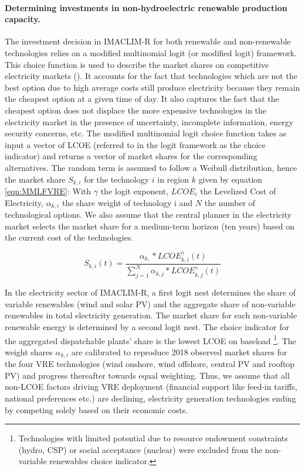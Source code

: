 \paragraph{Determining investments in non-hydroelectric renewable production capacity.}

The investment decision in IMACLIM-R for both renewable and non-renewable technologies relies on a modified multinomial logit (or modified logit) framework. This choice function is used to describe the market shares on competitive electricity markets (\cite{Clarke1993}). It accounts for the fact that technologies which are not the best option due to high average costs still produce electricity because they remain the cheapest option at a given time of day. It also captures the fact that the cheapest option does not displace the more expensive technologies in the electricity market in the presence of uncertainty, incomplete information, energy security concerns, etc. 
The modified multinomial logit choice function takes as input a vector of LCOE (referred to in the logit framework as the choice indicator) and returns a vector of market shares for the corresponding alternatives.  The random term is assumed to follow a Weibull distribution, hence the market share $S_{k,i}$ for the technology $i$ in region $k$ given by equation \ref{eqn:MMLFVRE}:
With $\gamma$ the logit exponent, $LCOE_{i}$ the Levelized Cost of Electricity, $\alpha_{k,i}$ the share weight of technology i and $N$ the number of technological options.
We also assume that the central planner in the electricity market selects the market share for a medium-term horizon (ten years) based on the current cost of the technologies.


\begin{dmath}
    S_{k,i}(t) = \frac{\alpha_{k,}*LCOE_{k,i}^{\gamma}(t)}{\sum_{j=1}^{N} \alpha_{k,j}*LCOE_{k,j}^{\gamma}(t)}
    \label{eqn:MMLFVRE}
\end{dmath}

In the electricity sector of IMACLIM-R, a first logit nest determines the share of variable renewables (wind and solar PV) and the aggregate share of non-variable renewables in total electricity generation. The market share for each non-variable renewable energy is determined by a second logit nest.
The choice indicator for the aggregated dispatchable plants’ share is the lowest LCOE on baseload
\footnote{Technologies with limited potential due to resource endowment constraints (hydro, CSP) or social acceptance (nuclear) were excluded from the non-variable renewables choice indicator.}. The weight shares $\alpha_{k,i}$ are calibrated to reproduce 2018 observed market shares for the four VRE technologies (wind onshore, wind offshore, central PV and rooftop PV) and progress thereafter towards equal weighting. Thus, we assume that all non-LCOE factors driving VRE deployment (financial support like feed-in tariffs, national preferences etc.) are declining, electricity generation technologies ending by competing solely based on their economic costs.

